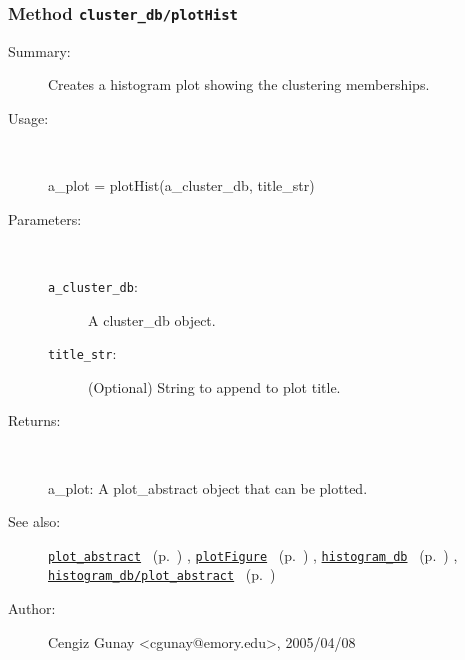 \subsubsection[Method \texttt{plotHist}]{Method \texttt{cluster\_db/plotHist}}%
%
\label{ref_cluster_db__plotHist}%
\hypertarget{ref_cluster_db__plotHist}{}%
\begin{description}
\item[Summary:]Creates a histogram plot showing the clustering memberships.
%
\item[Usage:]~%
\begin{lyxcode}%
a\_plot = plotHist(a\_cluster\_db, title\_str)
%
\end{lyxcode}%
%
%
\item[Parameters:]~
\begin{description}%
\item[\texttt{a\_cluster\_db}:]
 A cluster\_db object.
\item[\texttt{title\_str}:]
 (Optional) String to append to plot title.
\end{description}%
%
\item[Returns:
]~

	a\_plot: A plot\_abstract object that can be plotted.
%
%
\item[See also:]%
\hyperlink{ref_plot_abstract}{\texttt{plot\_abstract}}%
\ (p.~\pageref{ref_plot_abstract})%
%
, \hyperlink{ref_plotFigure}{\texttt{plotFigure}}%
\ (p.~\pageref{ref_plotFigure})%
%
, \hyperlink{ref_histogram_db}{\texttt{histogram\_db}}%
\ (p.~\pageref{ref_histogram_db})%
%
, \hyperlink{ref_histogram_db__plot_abstract}{\texttt{histogram\_db/plot\_abstract}}%
\ (p.~\pageref{ref_histogram_db__plot_abstract})%
%
%
\item[Author:]%
Cengiz Gunay <cgunay@emory.edu>, 2005/04/08
%
\end{description}
\methodline%
